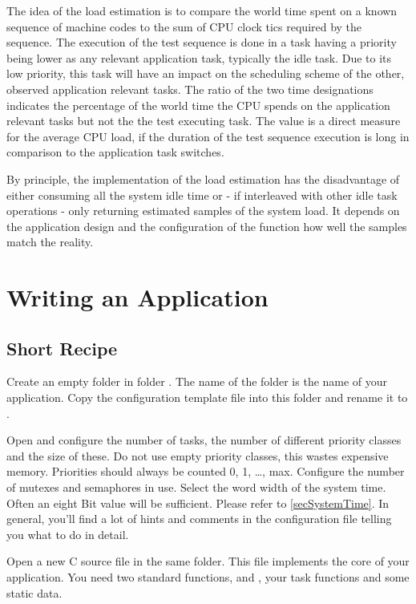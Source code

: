 The idea of the load estimation is to compare the world time spent on a
known sequence of machine codes to the sum of CPU clock tics required by
the sequence. The execution of the test sequence is done in a task having
a priority being lower as any relevant application task, typically the
idle task. Due to its low priority, this task will have an impact on the
scheduling scheme of the other, observed application relevant tasks. The
ratio of the two time designations indicates the percentage of the world
time the CPU spends on the application relevant tasks but not the the test
executing task. The value is a direct measure for the average CPU load, if
the duration of the test sequence execution is long in comparison to the
application task switches.

By principle, the implementation of the load estimation has the
disadvantage of either consuming all the system idle time or - if
interleaved with other idle task operations - only returning estimated
samples of the system load. It depends on the application design and the
configuration of the function how well the samples match the reality.


\chapter{Writing an \rtos{} Application}
\label{secHowToWriteApp}

\section{Short Recipe}

Create an empty folder in folder .
The name of the folder is the name of your application. Copy the
configuration template file  into this folder and
rename it to .

Open  and configure the number of tasks, the number
of different priority classes and the size of these. Do not use empty
priority classes, this wastes expensive memory. Priorities should always
be counted 0, 1, \ldots{}, max. Configure the number of mutexes and
semaphores in use. Select the word width of the system time. Often an
eight Bit value will be sufficient. Please refer to \ref{secSystemTime}.
In general, you'll find a lot of hints and comments in the configuration
file telling you what to do in detail.

Open a new C source file in the same folder. This file implements the core
of your application. You need two standard functions,  and
, your task functions and some static data.

